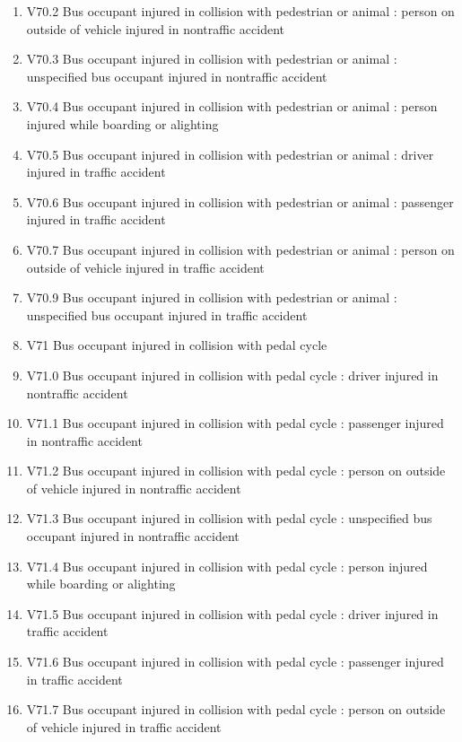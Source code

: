 \documentclass[
]{scrartcl}
\begin{document}
\begin{itemize}
\begin{enumerate}
  \item
    V70.2 Bus occupant injured in collision with pedestrian or animal :
    person on outside of vehicle injured in nontraffic accident
  \item
    V70.3 Bus occupant injured in collision with pedestrian or animal :
    unspecified bus occupant injured in nontraffic accident
  \item
    V70.4 Bus occupant injured in collision with pedestrian or animal :
    person injured while boarding or alighting
  \item
    V70.5 Bus occupant injured in collision with pedestrian or animal :
    driver injured in traffic accident
  \item
    V70.6 Bus occupant injured in collision with pedestrian or animal :
    passenger injured in traffic accident
  \item
    V70.7 Bus occupant injured in collision with pedestrian or animal :
    person on outside of vehicle injured in traffic accident
  \item
    V70.9 Bus occupant injured in collision with pedestrian or animal :
    unspecified bus occupant injured in traffic accident
  \item
    V71 Bus occupant injured in collision with pedal cycle
  \item
    V71.0 Bus occupant injured in collision with pedal cycle : driver
    injured in nontraffic accident
  \item
    V71.1 Bus occupant injured in collision with pedal cycle : passenger
    injured in nontraffic accident
  \item
    V71.2 Bus occupant injured in collision with pedal cycle : person on
    outside of vehicle injured in nontraffic accident
  \item
    V71.3 Bus occupant injured in collision with pedal cycle :
    unspecified bus occupant injured in nontraffic accident
  \item
    V71.4 Bus occupant injured in collision with pedal cycle : person
    injured while boarding or alighting
  \item
    V71.5 Bus occupant injured in collision with pedal cycle : driver
    injured in traffic accident
  \item
    V71.6 Bus occupant injured in collision with pedal cycle : passenger
    injured in traffic accident
  \item
    V71.7 Bus occupant injured in collision with pedal cycle : person on
    outside of vehicle injured in traffic accident

\end{enumerate}
\end{itemize}
\end{document}
